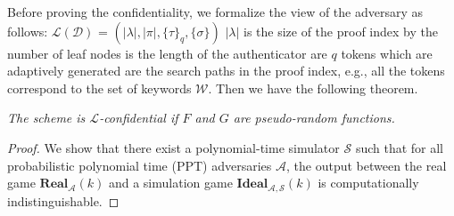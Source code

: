 Before proving the confidentiality, we formalize the view of the adversary as follows: $\mathcal{L}(\mathcal{D})$ = $(|\lambda|,|\pi|,\{\tau\}_q,\{\sigma\})$ $|\lambda|$ is the size of the proof index  by the number of leaf nodes is the length of the authenticator are $q$ tokens which are adaptively generated are the search paths in the proof index, e.g., all the tokens correspond to the set of keywords $\mathcal{W}$. Then we have the following theorem.

\begin{theorem}
  {\itshape
    The \name scheme is $\mathcal{L}$-confidential if $F$ and $G$ are pseudo-random functions.
  }
\end{theorem}

\begin{proof}
  We show that there exist a polynomial-time simulator $\mathcal{S}$ such that for all probabilistic polynomial time (PPT) adversaries $\mathcal{A}$, the output between the real game $\mathbf{Real}_\mathcal{A}(k)$ and a simulation game $\mathbf{Ideal}_\mathcal{A,S}(k)$ is computationally indistinguishable.


\end{proof}
